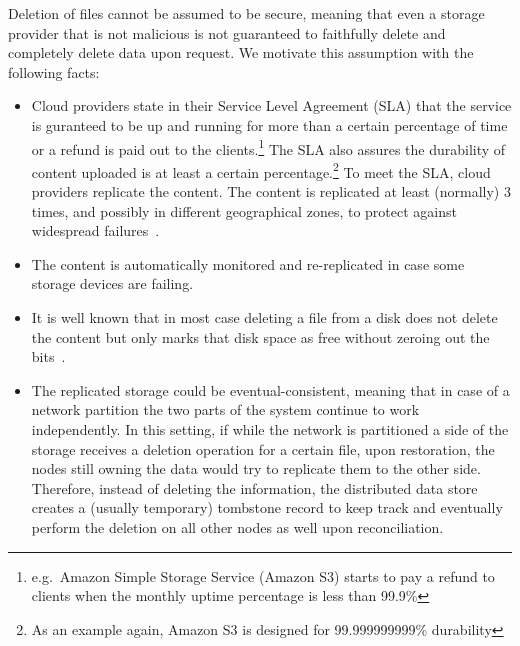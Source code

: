 Deletion of files cannot be assumed to be secure, meaning that even a storage provider that is
not malicious is not guaranteed to faithfully delete and completely delete data upon request.
We motivate this assumption with the following facts:
\begin{itemize}
    \item Cloud providers state in their Service Level Agreement (SLA) that
    the service is guranteed to be up and running for more than a certain percentage of time or a refund is paid out to the clients.\footnote{e.g.\ Amazon Simple Storage Service (Amazon S3) starts to pay a refund to clients when the monthly uptime percentage is less than 99.9\%}
    The SLA also assures the durability of content uploaded is at least a certain percentage.\footnote{As an example again, Amazon S3 is designed for 99.999999999\% durability}
    To meet the SLA, cloud providers replicate the content. The content is replicated at least (normally) 3 times, and possibly in different geographical zones, to protect against widespread failures~\cite{AzureBlobStorage}.
    \item The content is automatically monitored and re-replicated in case some storage devices are failing.
    \item It is well known that in most case deleting a file from a disk does not delete the content but only marks that disk space as free without zeroing out the bits~\cite{manRM}.
    \item The replicated storage could be eventual-consistent, 
    meaning that in case of a network partition the two 
    parts of the system continue to work independently. 
    In this setting, if while the network is partitioned 
    a side of the storage receives a deletion operation 
    for a certain file, upon restoration,
    the nodes still owning the data would try to replicate 
    them to the other side.
    Therefore, instead of deleting the information, 
    the distributed data store creates a (usually temporary) 
    tombstone record to keep track and eventually perform 
    the deletion on all other nodes as well upon reconciliation.
\end{itemize}

